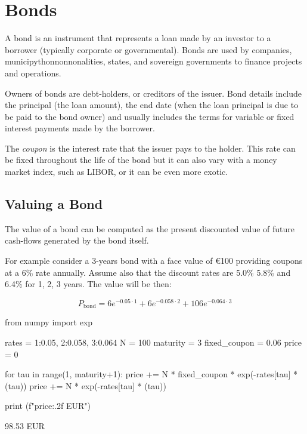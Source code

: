 \chapter{Bonds}
\label{bonds}

A bond is an instrument that represents a loan made by an investor to a borrower (typically corporate or governmental). Bonds are used by companies, municipythonnonnonalities, states, and sovereign governments to finance projects and operations. 

Owners of bonds are debt-holders, or creditors of the issuer. Bond details include the principal (the loan amount), the end date (when the loan principal is due to be paid to the bond owner) and usually includes the terms for variable or fixed interest payments made by the borrower.

The \emph{coupon} is the interest rate that the issuer pays to the holder. This rate can be fixed throughout the life of the bond but it can also vary with a money market index, such as LIBOR, or it can be even more exotic.

\section{Valuing a Bond}
\label{sec:bond_pricing}

The value of a bond can be computed as the present discounted value of future cash-flows generated by the bond itself.

For example consider a 3-years bond with a face value of \euro{100} providing coupons at a 6\% rate annually. Assume also that the discount rates are 5.0\% 5.8\% and 6.4\% for 1, 2, 3 years. The value will be then:

\begin{equation*}
P_{\mathrm{bond}}=6e^{-0.05\cdot 1}+6e^{-0.058\cdot 2}+106e^{-0.064\cdot 3}
\end{equation*}

\begin{ipythonnon}
from numpy import exp

rates = {1:0.05, 2:0.058, 3:0.064}
N = 100
maturity = 3
fixed_coupon = 0.06
price = 0

for tau in range(1, maturity+1):
    price += N * fixed_coupon * exp(-rates[tau] * (tau))
price += N * exp(-rates[tau] * (tau))

print (f"{price:.2f} EUR")
\end{ipythonnon}
\begin{ioutput}
98.53 EUR
\end{ioutput}

